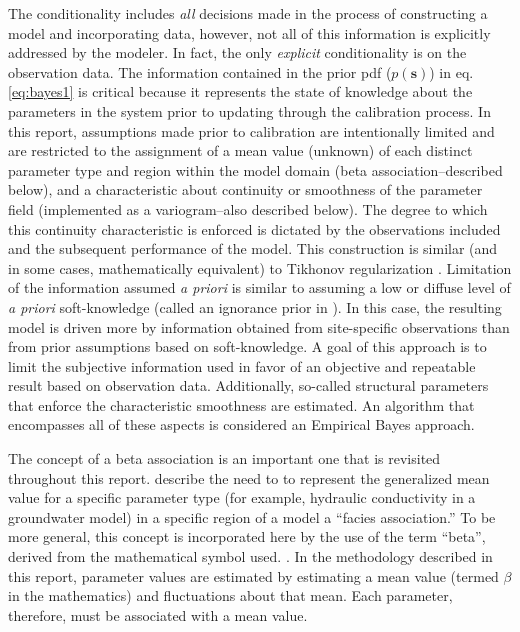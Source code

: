 \documentclass[11pt,oneside,onecolumn]{usgsreport}
\begin{document}
\begin{multicols}{2}
\begin{bibunit}
The conditionality includes \emph{all }decisions made in the process
of constructing a model and incorporating data, however, not all of
this information is explicitly addressed by the modeler. In fact,
the only \emph{explicit }conditionality is on the observation data.
The information contained in the prior pdf ($p\left(\mathbf{s}\right)$)
in eq. \ref{eq:bayes1} is critical because it represents the state
of knowledge about the parameters in the system prior to updating
through the calibration process. In this report, assumptions made
prior to calibration are intentionally limited and are restricted
to the assignment of a mean value (unknown) of each distinct parameter
type and region within the model domain (beta association--described
below), and a characteristic about continuity or smoothness of the
parameter field (implemented as a variogram--also described below).
The degree to which this continuity characteristic is enforced is
dictated by the observations included and the subsequent performance
of the model. This construction is similar (and in some cases, mathematically
equivalent) to Tikhonov regularization \citep{Tikhonov1963a,Tikhonov1963b,AsterEtal2005}.
Limitation of the information assumed \emph{a priori }is similar to
assuming a low or diffuse level of \emph{a priori }soft-knowledge
(called an ignorance prior in \citealt[chapter 12]{jaynesBook}).
In this case, the resulting model is driven more by information obtained
from site-specific observations than from prior assumptions based
on soft-knowledge. A goal of this approach is to limit the subjective
information used in favor of an objective and repeatable result based
on observation data. Additionally, so-called structural parameters
that enforce the characteristic smoothness are estimated. An algorithm
that encompasses all of these aspects is considered an Empirical Bayes
approach.

The concept of a beta association is an important one that is revisited
throughout this report. \citet{fienenIsthmusWRR} describe the need
to to represent the generalized mean value for a specific parameter
type (for example, hydraulic conductivity in a groundwater model)
in a specific region of a model a ``facies association.'' To be more
general, this concept is incorporated here by the use of the term
``beta'', derived from the mathematical symbol used. . In the methodology
described in this report, parameter values are estimated by estimating
a mean value (termed $\beta$ in the mathematics) and fluctuations
about that mean. Each parameter, therefore, must be associated with
a mean value.


\end{bibunit}
\end{multicols}
\end{document}
